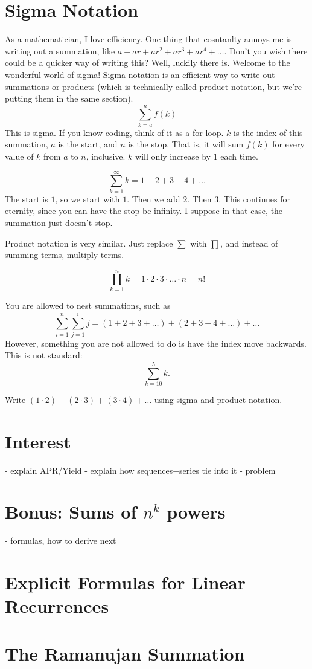 \section{Sigma Notation}
As a mathematician, I love efficiency. One thing that cosntanlty annoys me is writing out a summation, like $a+ar+ar^2+ar^3+ar^4+\dots$. Don't you wish there could be a quicker way of writing this? Well, luckily there is. Welcome to the wonderful world of sigma!
Sigma notation is an efficient way to write out summations or products (which is technically called product notation, but we're putting them in the same section).
\[\sum_{k=a}^{n}f(k)\]
This is sigma. If you know coding, think of it as a for loop. $k$ is the index of this summation, $a$ is the start, and $n$ is the stop. That is, it will sum $f(k)$ for every value of $k$ from $a$ to $n$, inclusive. $k$ will only increase by $1$ each time. 
\begin{example}
    \[\sum_{k=1}^{\infty}k=1+2+3+4+\dots\]
    The start is $1$, so we start with $1$. Then we add $2$. Then $3$. This continues for eternity, since you can have the stop be infinity. I suppose in that case, the summation just doesn't stop. 
\end{example}
Product notation is very similar. Just replace $\sum$ with $\prod$, and instead of summing terms, multiply terms.
\begin{example}[n!]
    \[\prod_{k=1}^{n}k=1\cdot 2\cdot 3\cdot \dots \cdot n=n!\]
\end{example}
You are allowed to nest summations, such as 
\[\sum_{i=1}^{n}\sum_{j=1}^{i}j=(1+2+3+\dots)+(2+3+4+\dots)+\dots\]
However, something you are not allowed to do is have the index move backwards. This is not standard:
\[\sum_{k=10}^{5}k.\]
\begin{problem}
    Write $(1\cdot2)+(2\cdot 3)+(3\cdot 4)+\dots$ using sigma and product notation.
\end{problem}
\section{Interest}
- explain APR/Yield
- explain how sequences+series tie into it
- problem 

\begin{subappendices}
\section{Bonus: Sums of $n^k$ powers}
    - formulas, how to derive next
\section{Explicit Formulas for Linear Recurrences}
\section{The Ramanujan Summation}
\end{subappendices}